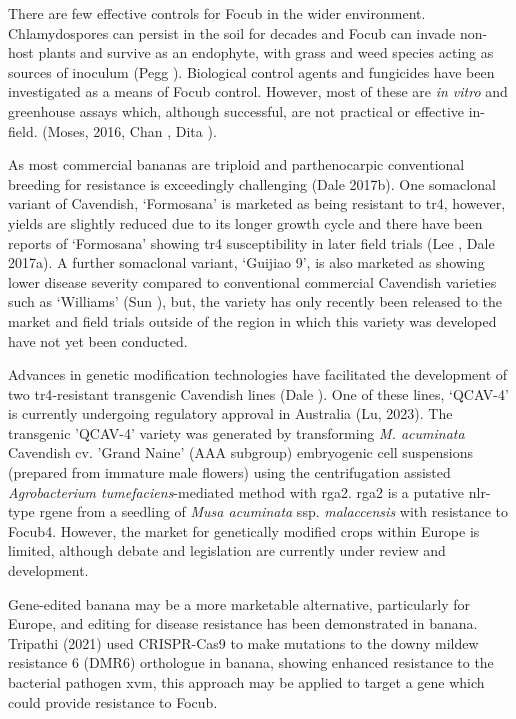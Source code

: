 There are few effective controls for \ac{Focub} in the wider environment. Chlamydospores can persist in the soil for decades and \ac{Focub} can invade non-host plants and survive as an endophyte, with grass and weed species acting as sources of inoculum (Pegg ). Biological control agents and fungicides have been investigated as a means of \ac{Focub} control. However, most of these are \textit{in vitro} and greenhouse assays which, although successful, are not practical or effective in-field. (Moses, 2016, Chan , Dita ).  

As most commercial bananas are triploid and parthenocarpic conventional breeding for resistance is exceedingly challenging (Dale \et 2017b). One somaclonal variant of Cavendish, ‘Formosana’ is marketed as being resistant to \ac{tr4}, however, yields are slightly reduced due to its longer growth cycle and there have been reports of  ‘Formosana’ showing \ac{tr4} susceptibility in later field trials (Lee , Dale \et 2017a). A further somaclonal variant, ‘Guijiao 9’, is also marketed as showing lower disease severity compared to conventional commercial Cavendish varieties such as ‘Williams’ (Sun ), but, the variety has only recently been released to the market and field trials outside of the region in which this variety was developed have not yet been conducted.  

Advances in genetic modification technologies have facilitated the development of two \ac{tr4}-resistant transgenic Cavendish lines (Dale ). One of these lines, ‘QCAV-4’ is currently undergoing regulatory approval in Australia (Lu, 2023). The transgenic 'QCAV-4' variety was generated by transforming \textit{M. acuminata }Cavendish cv. 'Grand Naine' (AAA subgroup) embryogenic cell suspensions (prepared from immature male flowers) using the centrifugation assisted \textit{Agrobacterium tumefaciens}-mediated method with \ac{rga2}. \ac{rga2} is a putative \ac{nlr}-type \ac{rgene} from a seedling of \textit{Musa acuminata} ssp. \textit{malaccensis} with resistance to \ac{Focub4}. However, the market for genetically modified crops within Europe is limited, although debate and legislation are currently under review and development. 

Gene-edited banana may be a more marketable alternative, particularly for Europe, and editing for disease resistance has been demonstrated in banana. Tripathi \et (2021) used CRISPR-Cas9 to make mutations to the downy mildew resistance 6 (DMR6) orthologue in banana, showing enhanced resistance to the bacterial pathogen \ac{xvm}, this approach may be applied to target a gene which could provide resistance to \ac{Focub}.  


